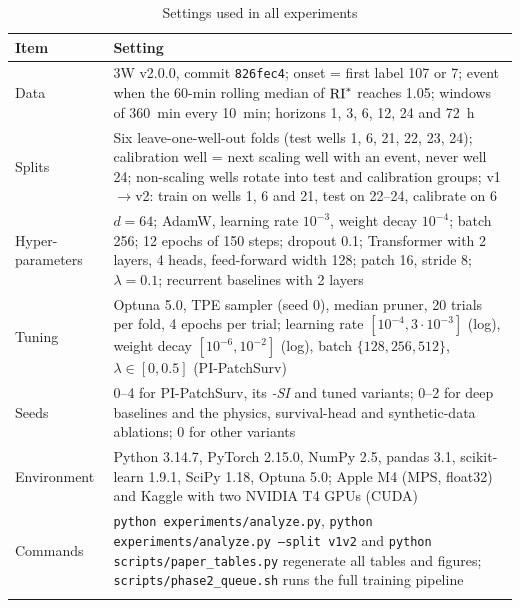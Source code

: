 \begin{table}[h]
\caption{Settings used in all experiments}
\label{tab:repro}
\footnotesize
\begin{tabular*}{\textwidth}{@{\extracolsep\fill}p{2.2cm}p{9.8cm}}
\toprule
Item & Setting \\
\midrule
Data & 3W v2.0.0, commit \texttt{826fec4}; onset = first label 107 or 7; event when the 60-min rolling median of $\mathrm{RI}^{*}$ reaches 1.05; windows of 360~min every 10~min; horizons 1, 3, 6, 12, 24 and 72~h \\
Splits & Six leave-one-well-out folds (test wells 1, 6, 21, 22, 23, 24); calibration well = next scaling well with an event, never well 24; non-scaling wells rotate into test and calibration groups; v1$\to$v2: train on wells 1, 6 and 21, test on 22--24, calibrate on 6 \\
Hyper-parameters & $d=64$; AdamW, learning rate $10^{-3}$, weight decay $10^{-4}$; batch 256; 12 epochs of 150 steps; dropout 0.1; Transformer with 2 layers, 4 heads, feed-forward width 128; patch 16, stride 8; $\lambda=0.1$; recurrent baselines with 2 layers \\
Tuning & Optuna 5.0, TPE sampler (seed 0), median pruner, 20 trials per fold, 4 epochs per trial; learning rate $[10^{-4},3\cdot10^{-3}]$ (log), weight decay $[10^{-6},10^{-2}]$ (log), batch $\{128,256,512\}$, $\lambda\in[0,0.5]$ (PI-PatchSurv) \\
Seeds & 0--4 for PI-PatchSurv, its \emph{-SI} and tuned variants; 0--2 for deep baselines and the physics, survival-head and synthetic-data ablations; 0 for other variants \\
Environment & Python 3.14.7, PyTorch 2.15.0, NumPy 2.5, pandas 3.1, scikit-learn 1.9.1, SciPy 1.18, Optuna 5.0; Apple M4 (MPS, float32) and Kaggle with two NVIDIA T4 GPUs (CUDA) \\
Commands & \texttt{python experiments/analyze.py}, \texttt{python experiments/analyze.py --split v1v2} and \texttt{python scripts/paper\_tables.py} regenerate all tables and figures; \texttt{scripts/phase2\_queue.sh} runs the full training pipeline \\
\botrule
\end{tabular*}
\end{table}
